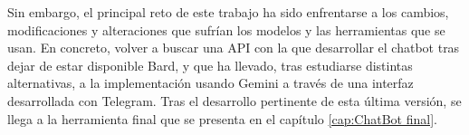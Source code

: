 Sin embargo, el principal reto de este trabajo ha sido enfrentarse a los cambios, modificaciones y alteraciones que sufrían los modelos y las herramientas que se usan. En concreto, volver a buscar una API con la que desarrollar el chatbot tras dejar de estar disponible Bard, y que ha llevado, tras estudiarse distintas alternativas, a la implementación usando Gemini a través de una interfaz desarrollada con Telegram. Tras el desarrollo pertinente de esta última versión, se llega a la herramienta final que se presenta en el capítulo \ref{cap:ChatBot final}.



 
